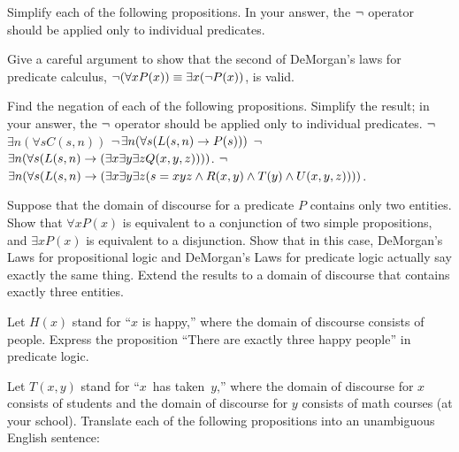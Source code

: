 \begin{exercises}

\problem Simplify each of the following propositions.  In your answer, the
$\lnot$ operator should be applied only to individual predicates.

\problem Give a careful argument to show that the second of DeMorgan's laws for
predicate calculus,
$\lnot(\forall x P(x)) \equiv \exists x(\lnot P(x))$, is valid.

\problem Find the negation of each of the following propositions.
Simplify the result; in your answer, the
$\lnot$ operator should be applied only to individual predicates.
\ppart $\lnot$$\exists n (\forall s C(s,n))$
\ppart $\lnot$$\exists n (\forall s (L(s,n) \rightarrow P(s)))$
\ppart $\lnot$$\exists n (\forall s (L(s,n) \rightarrow (\exists x \exists y \exists z Q(x,y,z))))$.
\ppart $\lnot$$\exists n (\forall s (L(s,n) \rightarrow (\exists x \exists y \exists z (s=xyz \wedge 
R(x,y) \wedge T(y) \wedge U(x,y,z))))$.

\problem Suppose that the domain of discourse for a predicate $P$
contains only two entities.  Show that $\forall x P(x)$ is equivalent to
a conjunction of two simple propositions, and $\exists x P(x)$ is equivalent
to a disjunction.  Show that in this case, DeMorgan's Laws for propositional
logic and DeMorgan's Laws for predicate logic actually say exactly the same
thing.  Extend the results to a domain of discourse that contains exactly
three entities.

\problem Let $H(x)$ stand for ``$x$ is happy,'' where the domain of discourse
consists of people.  Express the proposition ``There are exactly three happy
people'' in predicate logic.

\problem Let $T(x,y)$ stand for ``$x$~has taken~$y$,'' where the
domain of discourse for $x$ consists of students and the domain
of discourse for $y$ consists of math courses (at your school).
Translate each of the following propositions into an unambiguous English sentence:


\end{exercises}

